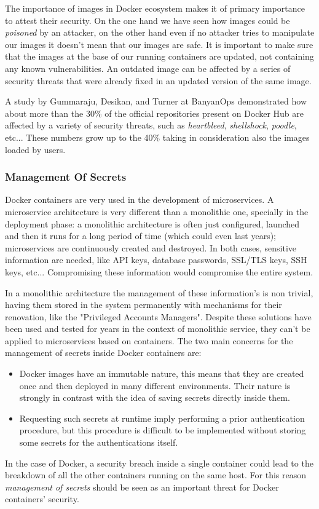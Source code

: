 \documentclass[a4paper,12pt]{article}
\begin{document}
The importance of images in Docker ecosystem makes it of primary importance to
attest their security. On the one hand we have seen how images could be
\textit{poisoned} by an attacker, on the other hand even if no attacker tries to
manipulate our images it doesn't mean that our images are safe. It is important
to make sure that the images at the base of our running containers are updated,
not containing any known vulnerabilities. An outdated image can be affected by a
series of security threats that were already fixed in an updated version of the
same image. \par A study by Gummaraju, Desikan, and Turner at BanyanOps
demonstrated how about more than the 30\% of the official repositories present
on Docker Hub are affected by a variety of security threats, such as
\textit{heartbleed}, \textit{shellshock}, \textit{poodle}, etc... These numbers
grow up to the 40\% taking in consideration also the images loaded by
users\cite{gummaraju_desikan_turner}. 

\subsubsection{Management Of Secrets}

Docker containers are very used in the development of microservices. A
microservice architecture is very different than a monolithic one, specially in
the deployment phase: a monolithic architecture is often just configured,
launched and then it runs for a long period of time (which could even last
years); microservices are continuously created and destroyed. In both cases,
sensitive information are needed, like API keys, database passwords, SSL/TLS
keys, SSH keys, etc... Compromising these information would compromise the
entire system. \par In a monolithic architecture the management of these
information's is non trivial, having them stored in the system permanently with
mechanisms for their renovation, like the "Privileged Accounts
Managers"\cite{privileged_accounts_managers}. Despite these solutions have been
used and tested for years in the context of monolithic service, they can't be
applied to microservices based on containers. The two main concerns for the
management of secrets inside Docker containers
are\cite{secret_management_concerns_docker}:
\begin{itemize}
  \item Docker images have an immutable nature, this means that they are created
  once and then deployed in many different environments. Their nature is
  strongly in contrast with the idea of saving secrets directly inside them.  
  \item Requesting such secrets at runtime imply performing a prior
  authentication procedure, but this procedure is difficult to be implemented
  without storing some secrets for the authentications itself.
\end{itemize}
\par In the case of Docker, a security breach inside a single container could
lead to the breakdown of all the other containers running on the same host. For
this reason \textit{management of secrets} should be seen as an important threat
for Docker containers' security.
\end{document}
